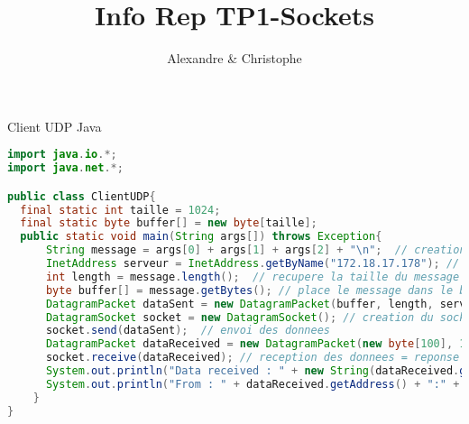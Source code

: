 \documentclass{article}
\title{Info Rep TP1-Sockets}
\author{Alexandre \bsc{Brehmer} \& Christophe \bsc{Cluizel}}
\begin{document}
\maketitle
Client UDP Java
\begin{lstlisting}[language=JAVA]
import java.io.*;
import java.net.*;

public class ClientUDP{
  final static int taille = 1024;
  final static byte buffer[] = new byte[taille];
  public static void main(String args[]) throws Exception{
      String message = args[0] + args[1] + args[2] + "\n";  // creation du message
      InetAddress serveur = InetAddress.getByName("172.18.17.178"); // assignation de l'adresse ip du serveur
      int length = message.length();  // recupere la taille du message
      byte buffer[] = message.getBytes(); // place le message dans le buffer
      DatagramPacket dataSent = new DatagramPacket(buffer, length, serveur, 2000);  // creation du datagramme
      DatagramSocket socket = new DatagramSocket(); // creation du socket
      socket.send(dataSent);  // envoi des donnees
      DatagramPacket dataReceived = new DatagramPacket(new byte[100], 100); // 100 est le nombre de caracteres que l'on peut recevoir
      socket.receive(dataReceived); // reception des donnees = reponse du serveur
      System.out.println("Data received : " + new String(dataReceived.getData()));
      System.out.println("From : " + dataReceived.getAddress() + ":" + dataReceived.getPort());
    }
}
\end{lstlisting}
\end{document}
